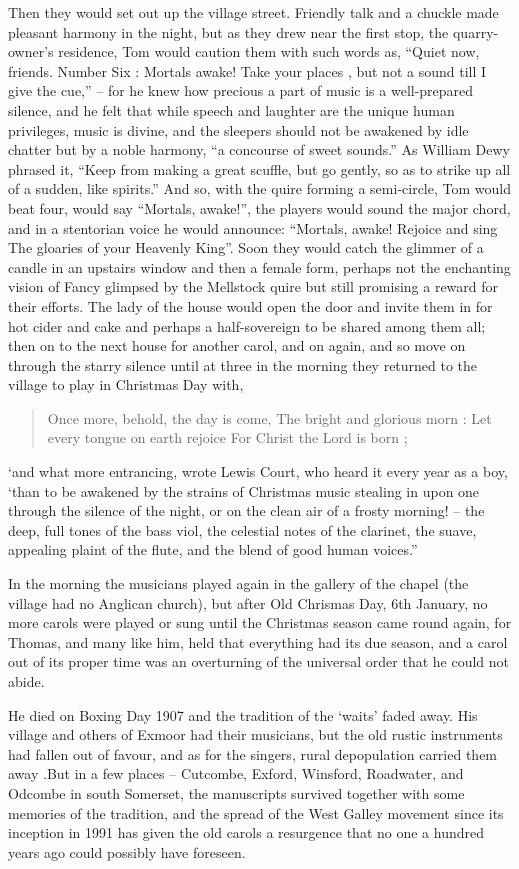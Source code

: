 Then they would set out up the village street. Friendly talk and a chuckle made pleasant harmony in the night, but as they drew near the first stop, the quarry-owner’s residence, Tom would caution them with such words as, “Quiet now, friends. Number Six : Mortals awake! Take your places , but not a sound till I give the cue,” – for he knew how precious a part of music is a well-prepared silence, and he felt that while speech and laughter are the unique human privileges, music is divine, and the sleepers should not be awakened by idle chatter but by a noble harmony, “a concourse of sweet sounds.” As William Dewy phrased it, “Keep from making a great scuffle, but go gently, so as to strike up all of a sudden, like spirits.” And so, with the quire forming a semi-circle, Tom would beat four, would say “Mortals, awake!”, the players would sound the major chord, and in a stentorian voice he would announce:
“Mortals, awake! Rejoice and sing
 The gloaries of your Heavenly King”.
 Soon they would catch the glimmer of a candle in an upstairs window and then a female form, perhaps not the enchanting vision of Fancy glimpsed by the Mellstock quire but still promising a reward for their efforts. The lady of the house would open the door and invite them in for hot cider and cake and perhaps a half-sovereign to be shared among them all; then on to the next house for another carol, and on again, and so move on through the starry silence until at three in the morning they returned to the village to play in Christmas Day with,
 
 \begin{quote}
 	Once more, behold, the day is come,
	 The bright and glorious morn :
	Let every tongue on earth rejoice
	 For Christ the Lord is born ;
 \end{quote}

 
‘and what more entrancing, wrote Lewis Court, who heard it every year as a boy, ‘than to be awakened by the strains of Christmas music stealing in upon one through the silence of the night, or on the clean air of a frosty morning! – the deep, full tones of the bass viol, the celestial notes of the clarinet, the suave, appealing plaint of the flute, and the blend of good human voices.”

In the morning the musicians played again in the gallery of the chapel (the village had no Anglican church), but after Old Chrismas Day, 6th January, no more carols were played or sung until the Christmas season came round again, for Thomas, and many like him, held that everything had its due season, and a carol out of its proper time was an overturning of the universal order that he could not abide. 

He died on Boxing Day 1907 and the tradition of the ‘waits’ faded away. His village and others of Exmoor had their musicians, but the old rustic instruments had fallen out of favour, and as for the singers, rural depopulation carried them away .But in a few places – Cutcombe, Exford, Winsford, Roadwater, and Odcombe in south Somerset, the manuscripts survived together with some memories of the tradition, and the spread of the West Galley movement since its inception in 1991 has given the old carols a resurgence that no one a hundred years ago could possibly have foreseen. 
